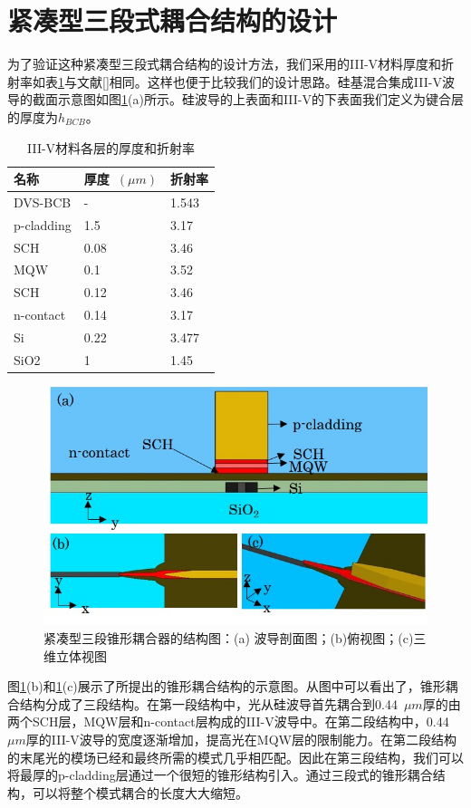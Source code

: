 \section{紧凑型三段式耦合结构的设计}
为了验证这种紧凑型三段式耦合结构的设计方法，我们采用的III-V材料厚度和折射率如表\ref{IIIV_qian_str}与文献[]相同。这样也便于比较我们的设计思路。硅基混合集成III-V波导的截面示意图如图\ref{fig_ch3_3d_taper}(a)所示。硅波导的上表面和III-V的下表面我们定义为键合层的厚度为$h_{BCB}$。
{
	\begin{table}[htb]
		\caption{III-V材料各层的厚度和折射率\cite{wang2012heterogeneous}}
		\label{IIIV_qian_str}
		\centering
		\begin{tabular}[t]{lll}
			\hline
			名称  & 厚度~$(\mu m)$  & 折射率 \\
			\hline
			DVS-BCB & - & 1.543\\
			p-cladding & 1.5 &3.17 \\
			SCH & 0.08 & 3.46 \\
			MQW & 0.1 & 3.52 \\
			SCH & 0.12 & 3.46 \\
			n-contact & 0.14 & 3.17 \\
			Si & 0.22 & 3.477 \\
			SiO2 & 1 & 1.45 \\
			\hline
		\end{tabular}
	\end{table}
}

\begin{figure}[htb]
	\centering
	\includegraphics[width=12cm]{./Pictures/fig_ch3_3d_taper.jpg}
	\caption{紧凑型三段锥形耦合器的结构图：(a) 波导剖面图；(b)俯视图；(c)三维立体视图}
	\label{fig_ch3_3d_taper}
\end{figure}


图\ref{fig_ch3_3d_taper}(b)和\ref{fig_ch3_3d_taper}(c)展示了所提出的锥形耦合结构的示意图。从图中可以看出了，锥形耦合结构分成了三段结构。在第一段结构中，光从硅波导首先耦合到0.44~$\mu m$厚的由两个SCH层，MQW层和n-contact层构成的III-V波导中。在第二段结构中，0.44~$\mu m$厚的III-V波导的宽度逐渐增加，提高光在MQW层的限制能力。在第二段结构的末尾光的模场已经和最终所需的模式几乎相匹配。因此在第三段结构，我们可以将最厚的p-cladding层通过一个很短的锥形结构引入。通过三段式的锥形耦合结构，可以将整个模式耦合的长度大大缩短。

